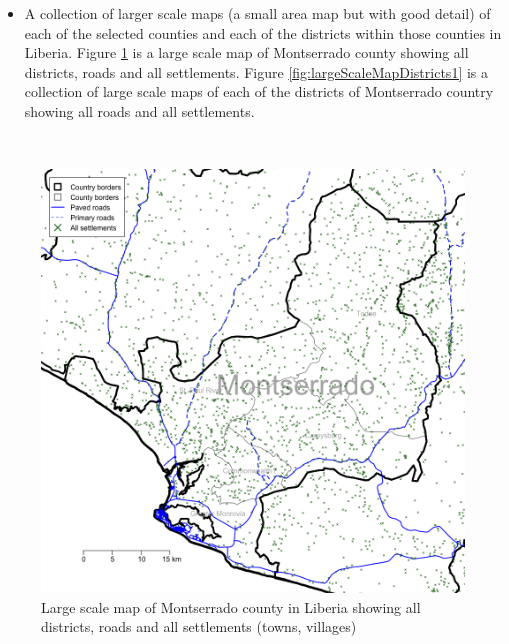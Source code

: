 \documentclass[12pt,a4paper]{book}
\providecommand{\tightlist}{%
  \setlength{\itemsep}{0pt}\setlength{\parskip}{0pt}}
\theoremstyle{definition}
\theoremstyle{definition}
\theoremstyle{definition}
\theoremstyle{remark}
\begin{document}
\newpage

\begin{itemize}
\tightlist
\item
  A collection of larger scale maps (a small area map but with good
  detail) of each of the selected counties and each of the districts
  within those counties in Liberia. Figure
  \ref{fig:largeScaleMapCounty1} is a large scale map of Montserrado
  county showing all districts, roads and all settlements. Figure
  \ref{fig:largeScaleMapDistricts1} is a collection of large scale maps
  of each of the districts of Montserrado country showing all roads and
  all settlements.
\end{itemize}

~

\begin{figure}[H]

{\centering \includegraphics{figures/largeScaleMapCounty1-1} 

}

\caption{Large scale map of Montserrado county in Liberia showing all districts, roads and all settlements (towns, villages)}\label{fig:largeScaleMapCounty1}
\end{figure}

\newpage
\end{document}

